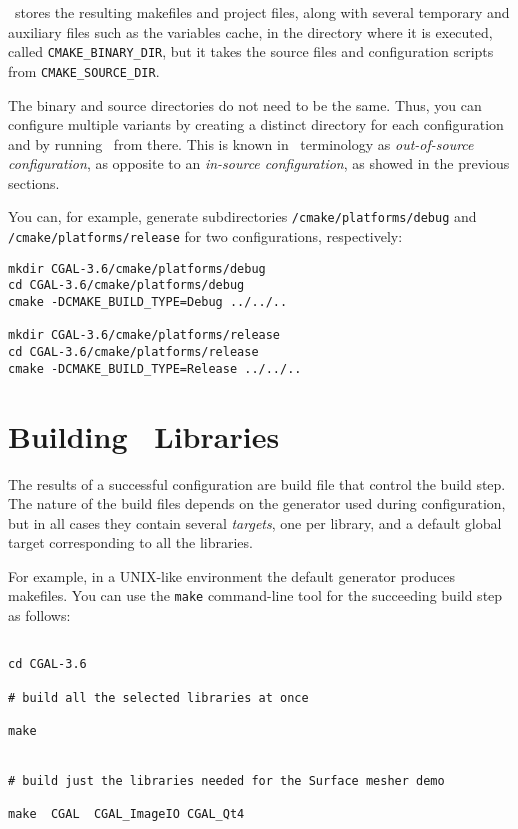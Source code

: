 \cmake\ stores the resulting makefiles and project files, along with several temporary and auxiliary files such
as the variables cache, in the directory where it is executed, called \texttt{CMAKE\_BINARY\_DIR}, but it
takes the source files and configuration scripts from
\texttt{CMAKE\_SOURCE\_DIR}.

The binary and source directories do not need to be the same. Thus, you can configure multiple variants by creating a
distinct directory for each configuration and by running \cmake\ from there. This is known in \cmake\ terminology
as  {\em out-of-source configuration}, as opposite to an {\em in-source
  configuration}, as showed in the previous sections.

You can, for example, generate subdirectories \cgaldir{}\texttt{/cmake/platforms/debug} and 
\cgaldir{}\texttt{/cmake/platforms/release} for two configurations, respectively:

{\ccTexHtml{\scriptsize}{}
\begin{verbatim}
mkdir CGAL-3.6/cmake/platforms/debug
cd CGAL-3.6/cmake/platforms/debug
cmake -DCMAKE_BUILD_TYPE=Debug ../../..

mkdir CGAL-3.6/cmake/platforms/release
cd CGAL-3.6/cmake/platforms/release
cmake -DCMAKE_BUILD_TYPE=Release ../../..
\end{verbatim}
}

\section{Building \cgal\ Libraries}

The results of a successful configuration are build file that control the build step.
The nature of the build files depends on the generator used during configuration, but in all cases they 
contain several {\em targets}, one per library,  and a default global target corresponding 
to all the libraries.

For example, in a UNIX-like environment the default generator produces
makefiles. You can use the \texttt{make} command-line tool for the
succeeding build step as follows:

{\ccTexHtml{\scriptsize}{}
\begin{verbatim}

cd CGAL-3.6

# build all the selected libraries at once

make 


# build just the libraries needed for the Surface mesher demo

make  CGAL  CGAL_ImageIO CGAL_Qt4

\end{verbatim}
}

